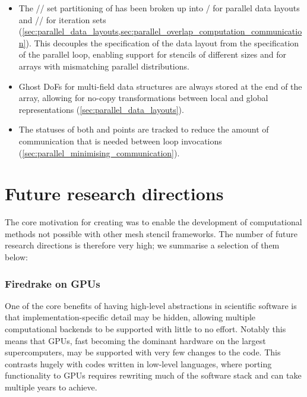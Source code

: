 \documentclass[thesis]{subfiles}
\begin{document}
\begin{itemize}
\begin{itemize}
      \item
        The \coreiter{}/\ownediter{}/\ghostiter{} set partitioning of  has been broken up into \ownediter{}/\ghostiter{} for parallel data layouts and \coreiter{}/\rootiter{}/\leafiter{} for iteration sets (\cref{sec:parallel_data_layouts,sec:parallel_overlap_computation_communication}).
        This decouples the specification of the data layout from the specification of the parallel loop, enabling support for stencils of different sizes and for arrays with mismatching parallel distributions.
      \item
        Ghost DoFs for multi-field data structures are always stored at the end of the array, allowing for no-copy transformations between local and global representations (\cref{sec:parallel_data_layouts}).
      \item
        The statuses of both \rootiter{} and \leafiter{} points are tracked to reduce the amount of communication that is needed between loop invocations (\cref{sec:parallel_minimising_communication}).
    \end{itemize}
\end{itemize}

\section{Future research directions}
\label{sec:future_work}

The core motivation for creating  was to enable the development of computational methods not possible with other mesh stencil frameworks.
The number of future research directions is therefore very high; we summarise a selection of them below:

\subsubsection{Firedrake on GPUs}

One of the core benefits of having high-level abstractions in scientific software is that implementation-specific detail may be hidden, allowing multiple computational backends to be supported with little to no effort.
Notably this means that GPUs, fast becoming the dominant hardware on the largest supercomputers, may be supported with very few changes to the code.
This contrasts hugely with codes written in low-level languages, where porting functionality to GPUs requires rewriting much of the software stack and can take multiple years to achieve.
\end{document}
